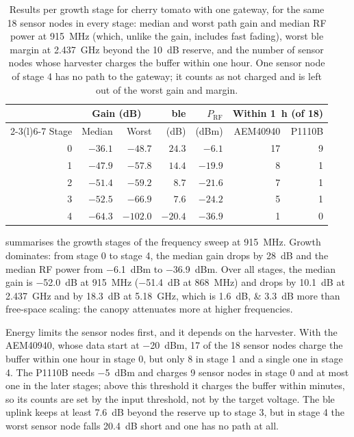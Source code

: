 \begin{table}[t]
\caption{Results per growth stage for cherry tomato with one gateway, for the same 18 sensor nodes in every stage: median and worst path gain and median RF power at \SI{915}{MHz} (which, unlike the gain, includes fast fading), worst \gls{ble} margin at \SI{2.437}{GHz} beyond the \SI{10}{dB} reserve, and the number of sensor nodes whose harvester charges the buffer within one hour. One sensor node of stage 4 has no path to the gateway; it counts as not charged and is left out of the worst gain and margin.}
\label{tab:usecase}
\centering\footnotesize
\setlength{\tabcolsep}{3.5pt}
\begin{tabular}{@{}rrrrrrr@{}}
\toprule
 & \multicolumn{2}{c}{Gain (dB)} & \gls{ble} & $P_{\mathrm{RF}}$ & \multicolumn{2}{c}{Within \SI{1}{h} (of 18)} \\
\cmidrule(lr){2-3}\cmidrule(l){6-7}
Stage & Median & Worst & (dB) & (dBm) & AEM40940 & P1110B \\
\midrule
0 & $-36.1$ & $-48.7$  & $24.3$  & $-6.1$  & 17 & 9 \\
1 & $-47.9$ & $-57.8$  & $14.4$  & $-19.9$ & 8  & 1 \\
2 & $-51.4$ & $-59.2$  & $8.7$   & $-21.6$ & 7  & 1 \\
3 & $-52.5$ & $-66.9$  & $7.6$   & $-24.2$ & 5  & 1 \\
4 & $-64.3$ & $-102.0$ & $-20.4$ & $-36.9$ & 1  & 0 \\
\bottomrule
\end{tabular}
\end{table}

 summarises the growth stages of the frequency sweep at \SI{915}{MHz}. Growth dominates: from stage 0 to stage 4, the median gain drops by \SI{28}{dB} and the median RF power from \SI{-6.1}{dBm} to \SI{-36.9}{dBm}. Over all stages, the median gain is \SI{-52.0}{dB} at \SI{915}{MHz} (\SI{-51.4}{dB} at \SI{868}{MHz}) and drops by \SI{10.1}{dB} at \SI{2.437}{GHz} and by \SI{18.3}{dB} at \SI{5.18}{GHz}, which is \SIlist{1.6;3.3}{dB} more than free-space scaling: the canopy attenuates more at higher frequencies.

Energy limits the sensor nodes first, and it depends on the harvester. With the AEM40940, whose data start at \SI{-20}{dBm}, 17 of the 18 sensor nodes charge the buffer within one hour in stage 0, but only 8 in stage 1 and a single one in stage 4. The P1110B needs \SI{-5}{dBm} and charges 9 sensor nodes in stage 0 and at most one in the later stages; above this threshold it charges the buffer within minutes, so its counts are set by the input threshold, not by the target voltage. The \gls{ble} uplink keeps at least \SI{7.6}{dB} beyond the reserve up to stage 3, but in stage 4 the worst sensor node falls \SI{20.4}{dB} short and one has no path at all.

